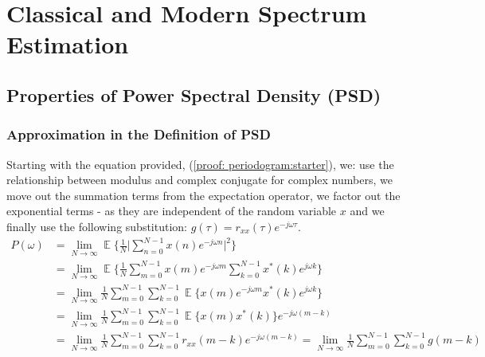 \documentclass[12pt]{article}
\date{April 2019}
\DeclareMathOperator*{\E}{\mathbb{E}}
\begin{document}


\newpage
\setcounter{tocdepth}{2} %
\tableofcontents

\newpage
\section{Classical and Modern Spectrum Estimation} \label{sec: 1-CMSE}
	\subsection{Properties of Power Spectral Density (PSD)} \label{sec: 1-1-prop-PSD}
	
	\subsubsection{Approximation in the Definition of PSD} \label{sec: 1-1a-prop-PSD}
	Starting with the equation provided, (\ref{proof: periodogram:starter}), we: use the relationship between modulus and complex conjugate for complex numbers, we move out the summation terms from the expectation operator, we factor out the exponential terms - as they are independent of the random variable $x$ and we finally use the following substitution:  $g(\tau) = r_{xx}(\tau) e^{-j\omega\tau}$.
	\begin{align}
		P(\omega)   & =\lim_{N\to\infty} \E \bigg\{ \frac{1}{N} \bigg| \sum_{n=0}^{N-1} x(n) e^{-j\omega n} \bigg|^{2} \bigg\}
		\label{proof: periodogram:starter}\\
		& = \lim_{N\to\infty} \E \bigg\{\frac{1}{N}
		\sum_{m=0}^{N-1} x(m) e^{-j\omega m} \sum_{k=0}^{N-1} x^{*}(k) e^{j\omega k} \bigg\}\nonumber\\
		& = \lim_{N\to\infty} \frac{1}{N}
		\sum_{m=0}^{N-1} \sum_{k=0}^{N-1} \E \bigg\{ x(m) e^{-j\omega m} x^{*}(k) e^{j\omega k} \bigg\}\nonumber\\
		& = \lim_{N\to\infty} \frac{1}{N}
		\sum_{m=0}^{N-1} \sum_{k=0}^{N-1} \E \bigg\{ x(m) x^{*}(k) \bigg\} e^{-j\omega(m-k)} \nonumber\\
		& = \lim_{N\to\infty} \frac{1}{N}
		\sum_{m=0}^{N-1} \sum_{k=0}^{N-1} r_{xx}(m-k) e^{-j\omega(m-k)}
		= \lim_{N\to\infty} \frac{1}{N}
		\sum_{m=0}^{N-1} \sum_{k=0}^{N-1} g(m-k)
		\label{proof: periodogram}
	\end{align}
	
\end{document}
